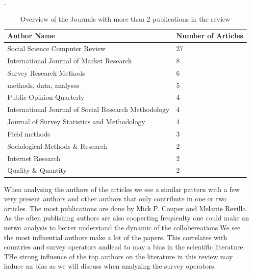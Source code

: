 \begin{table}
	\centerings. 
	\begin{tabular}{ll}
		\toprule
		Author Name & Number of Articles \\
		\midrule
        Social Science Computer Review & 27\\
        International Journal of Market Research & 8\\
        Survey Research Methods& 6\\
        methods, data, analyses & 5\\
        Public Opinion Quarterly & 4\\
        International Journal of Social Research Methodology & 4\\
        Journal of Survey Statistics and Methodology & 4\\
        Field methods & 3\\
        Sociological Methods \& Research & 2\\
        Internet Research & 2 \\
        Quality \& Quantity  & 2\\
		\bottomrule 
	\end{tabular}
	\caption{Overview of the Journals with more than 2 publications in the review}
	\label{tab: journals}
\end{table}

When analysing the authors of the articles we see a similar pattern with a few very present authors and other authors that only contribute in one or two articles. The most publications are done by Mick P. Couper and Melanie Revilla. As the often publishing authors are also cooperting frequenlty one could make an netwo analysis to better understand the dynamic of the collobereations.We see the most influential authors make a lot of the papers. This correlates with countries and survey operators andlead to may a bias in the scientific literature. THe strong influence of the top authors on the literature in this review may induce an bias as we will discuss when analyzing the survey operators.

